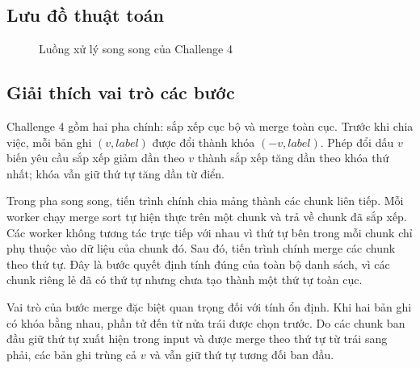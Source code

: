 \subsection{Lưu đồ thuật toán}
\begin{figure}[H]
\centering
{}
\caption{Luồng xử lý song song của Challenge 4}
\label{fig:challenge4-flow}
\end{figure}

\subsection{Giải thích vai trò các bước}
Challenge 4 gồm hai pha chính: sắp xếp cục bộ và merge toàn cục. Trước khi chia việc, mỗi bản ghi $(v, label)$ được đổi thành khóa $(-v, label)$. Phép đổi dấu $v$ biến yêu cầu sắp xếp giảm dần theo $v$ thành sắp xếp tăng dần theo khóa thứ nhất; khóa  vẫn giữ thứ tự tăng dần từ điển.

Trong pha song song, tiến trình chính chia mảng thành các chunk liên tiếp. Mỗi worker chạy merge sort tự hiện thực trên một chunk và trả về chunk đã sắp xếp. Các worker không tương tác trực tiếp với nhau vì thứ tự bên trong mỗi chunk chỉ phụ thuộc vào dữ liệu của chunk đó. Sau đó, tiến trình chính merge các chunk theo thứ tự. Đây là bước quyết định tính đúng của toàn bộ danh sách, vì các chunk riêng lẻ đã có thứ tự nhưng chưa tạo thành một thứ tự toàn cục.

Vai trò của bước merge đặc biệt quan trọng đối với tính ổn định. Khi hai bản ghi có khóa bằng nhau, phần tử đến từ nửa trái được chọn trước. Do các chunk ban đầu giữ thứ tự xuất hiện trong input và được merge theo thứ tự từ trái sang phải, các bản ghi trùng cả $v$ và  vẫn giữ thứ tự tương đối ban đầu.

